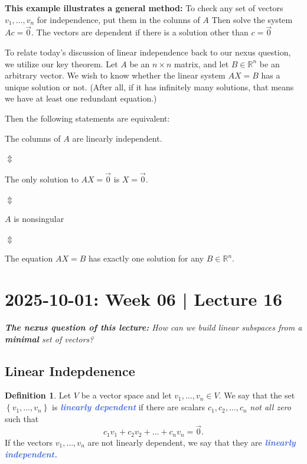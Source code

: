 \documentclass[10pt]{article}
\newcommand{\demph}[1]{\textcolor{RoyalBlue}{\textbf{\slshape #1}}} %
\theoremstyle{definition}
\newtheorem{definition}[theorem]{Definition}
\newcommand{\R}{\mathbb{R}}           %
\begin{document}
\textbf{This example illustrates a general method:} To check any set of
vectors $v_{1},\ldots,v_{n}$ for independence, put them in the colunns of $A$
Then solve the system $Ac=\vec{0}$. The vectors are dependent if there is a
solution other than $c=\vec{0} $



To relate today's discussion of linear independence back to our nexus
question, we utilize our key theorem. Let $A$ be an $n\times n$ matrix, and
let $B\in \R^{n}$ be an arbitrary vector. We wish to know whether the linear
system $AX=B$ has a unique solution or not. (After all, if it has infinitely
many solutions, that means we have at least one redundant equation.)


Then the following statements are equivalent:
\begin{center}
  The columns of $A$ are linearly independent.

  $\Updownarrow$
  
  The only solution to $AX=\vec{0}$ is $X=\vec{0}$.

  $\Updownarrow$

  $A$ is nonsingular
  
  $\Updownarrow$

  The equation $AX=B$ has exactly one solution for any $B\in \R^{n}$. 
\end{center}



\newpage

\newpage
\section{2025-10-01: Week 06 | Lecture 16}

\begin{center}
  \begin{tcolorbox}[width=0.9\textwidth, colback=white, colframe=black]
    \textit{\textbf{The nexus question of this lecture:} How can we build
      linear subspaces from a \textbf{minimal} set of vectors?}
  \end{tcolorbox}
\end{center}

\subsection{Linear Indepdenence}

\begin{definition}
  Let $V$ be a vector space and let $v_{1},\ldots,v_{n}\in V$. We say that the
  set $\left\{v_{1},\ldots,v_{n}\right\}$ is \demph{linearly dependent} if
  there are scalars $c_{1},c_{2},\ldots,c_{n}$ \textit{not all zero} such that
  \begin{equation*}
    c_{1}v_{1}+c_{2}v_{2}+\ldots+c_{n}v_{n} = \vec{0}.
  \end{equation*}
  If the vectors $v_{1},\ldots,v_{n}$ are not linearly dependent, we say that
  they are \demph{linearly independent.}
\end{definition}
\end{document}
